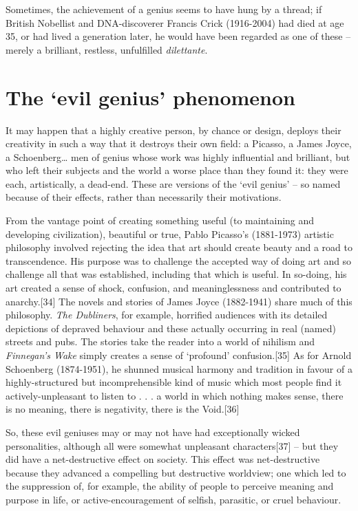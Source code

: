 \documentclass[
]{book}
\begin{document}
Sometimes, the achievement of a genius seems to have hung by a thread; if British Nobellist and DNA-discoverer Francis Crick (1916-2004) had died at age 35, or had lived a generation later, he would have been regarded as one of these -- merely a brilliant, restless, unfulfilled \emph{dilettante}.

\hypertarget{the-evil-genius-phenomenon}{%
\section{The `evil genius' phenomenon}\label{the-evil-genius-phenomenon}}

It may happen that a highly creative person, by chance or design, deploys their creativity in such a way that it destroys their own field: a Picasso, a James Joyce, a Schoenberg\ldots{} men of genius whose work was highly influential and brilliant, but who left their subjects and the world a worse place than they found it: they were each, artistically, a dead-end. These are versions of the `evil genius' -- so named because of their effects, rather than necessarily their motivations.

From the vantage point of creating something useful (to maintaining and developing civilization), beautiful or true, Pablo Picasso's (1881-1973) artistic philosophy involved rejecting the idea that art should create beauty and a road to transcendence. His purpose was to challenge the accepted way of doing art and so challenge all that was established, including that which is useful. In so-doing, his art created a sense of shock, confusion, and meaninglessness and contributed to anarchy.{[}34{]} The novels and stories of James Joyce (1882-1941) share much of this philosophy. \emph{The Dubliners}, for example, horrified audiences with its detailed depictions of depraved behaviour and these actually occurring in real (named) streets and pubs. The stories take the reader into a world of nihilism and \emph{Finnegan's Wake} simply creates a sense of `profound' confusion.{[}35{]} As for Arnold Schoenberg (1874-1951), he shunned musical harmony and tradition in favour of a highly-structured but incomprehensible kind of music which most people find it actively-unpleasant to listen to . . . a world in which nothing makes sense, there is no meaning, there is negativity, there is the Void.{[}36{]}

So, these evil geniuses may or may not have had exceptionally wicked personalities, although all were somewhat unpleasant characters{[}37{]} -- but they did have a net-destructive effect on society. This effect was net-destructive because they advanced a compelling but destructive worldview; one which led to the suppression of, for example, the ability of people to perceive meaning and purpose in life, or active-encouragement of selfish, parasitic, or cruel behaviour.
\end{document}
